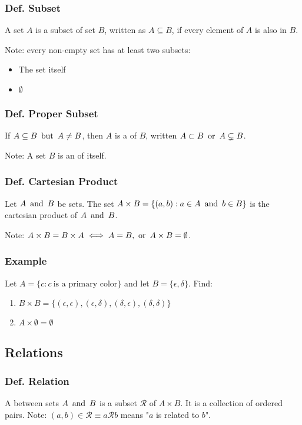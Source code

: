 \subsubsection{Def. Subset}
A set $A$ is a subset of set $B$, written as $A \subseteq B$, if every element of $A$ is also in $B$.

Note: every non-empty set has at least two subsets:
\begin{itemize}
    \item The set itself
    \item $\emptyset$
\end{itemize}

\subsubsection{Def. Proper Subset}
If $A \subseteq B \operatorname{~\text{but}~} A \not = B$, then $A$ is a  of $B$, written $A \subset B \operatorname{~\text{or}~} A \subsetneq B$.

Note: A set $B$ is an  of itself.

\subsubsection{Def. Cartesian Product}
Let $A \operatorname{~\text{and}~} B$ be sets. The set $A \times B = \{(a,b) : a \in A \operatorname{~\text{and}~} b \in B\}$ is the cartesian product of $A \operatorname{~\text{and}~} B$.

Note: $A \times B = B \times A \iff A = B, \operatorname{~\text{or}~} A \times B = \emptyset$.

\subsubsection*{Example}
Let $A = \{c : c ~\text{is a primary color}\}$ and let $B = \{\epsilon, \delta\}$. Find:
\begin{enumerate}
    \item $B \times B = \{(\epsilon, \epsilon),(\epsilon,\delta),(\delta,\epsilon),(\delta,\delta)\}$
    \item $A \times \emptyset = \emptyset$
\end{enumerate}

\subsection{Relations}

\subsubsection{Def. Relation}
A  between sets $A \operatorname{~\text{and}~} B$ is a subset $\mathcal{R}$ of $A \times B$. It is a collection of ordered pairs. Note: $(a,b) \in \mathcal{R} \equiv a\mathcal{R}b$ means "$a$ is related to $b$".

